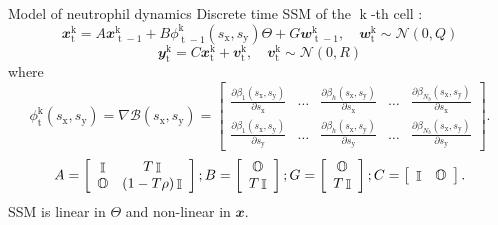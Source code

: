 \documentclass[mathserif,11pt]{beamer}
\DeclareMathOperator{\eye}{\mathbb{I}}
\DeclareMathOperator{\zeros}{\mathbb{O}}
\DeclareMathOperator{\td}{\mathrm{t}}
\DeclareMathOperator{\kd}{\mathrm{k}}
\begin{document}
\begin{frame}{Model of neutrophil dynamics}
\vspace{-0.1cm}
Discrete time SSM of the $\kd$-th cell :
\begin{equation*}\label{eq_dyn}
\mathbfit{x}^{\kd}_{\td} = A \mathbfit{x}^{\kd}_{\td-1} + B\phi_{\td-1}^{\kd}(s_{\mathrm{x}},s_{\mathrm{y}}) \Theta + G\mathbfit{w}^{\kd}_{\td-1}, \quad \mathbfit{w}^{\kd}_{\td} \sim \mathcal{N}(0, Q)
\end{equation*}
\begin{equation*}\label{eq_meas}
\mathbfit{y}^{\kd}_{\td} = C\mathbfit{x}^{\kd}_{\td} + \mathbfit{v}^{\kd}_{\td}, \quad \mathbfit{v}^{\kd}_{\td} \sim \mathcal{N}(0, R)
\end{equation*}
where
\begin{equation*}
\phi_{\td}^{\kd}(s_{\mathrm{x}},s_{\mathrm{y}}) = \nabla \mathcal{B}(s_{\mathrm{x}}, s_{\mathrm{y}}) = \left[\begin{array}{ccccc} \frac{ \partial\beta_1(s_{\mathrm{x}},s_{\mathrm{y}}) }{\partial s_{\mathrm{x}}} &
 \dots &\frac{ \partial\beta_h(s_{\mathrm{x}},s_{\mathrm{y}}) }{\partial s_{\mathrm{x}}}& \dots&\frac{ \partial\beta_{N_b}(s_{\mathrm{x}},s_{\mathrm{y}}) }{\partial s_{\mathrm{x}}} \\
\frac{ \partial\beta_1(s_{\mathrm{x}},s_{\mathrm{y}}) }{\partial s_{\mathrm{y}}} & \dots &\frac{ \partial\beta_h(s_{\mathrm{x}},s_{\mathrm{y}}) }{\partial s_{\mathrm{y}}}& \dots&\frac{ \partial\beta_{N_b}(s_{\mathrm{x}},s_{\mathrm{y}}) }{\partial s_{\mathrm{y}}}
\end{array}\right]. 
\end{equation*}
\begin{equation*}
A = \left[\begin{array}{cc}
\eye & T\eye \\
\zeros & (1-T\rho) \eye
\end{array}\right]; 
\hfil 
B = \left[\begin{array}{c}
\zeros \\ T \eye
\end{array}\right];
\hfil
G = \left[ \begin{array}{c}
\zeros \\ T\eye
\end{array} \right]; 
\hfil
C = \left[ \begin{array}{cc}
\eye & \zeros
\end{array}\right].
\end{equation*}
\vspace{0.3cm}
SSM is linear in $\Theta$ and non-linear in $\mathbfit{x}$.   
\end{frame}
\end{document}
